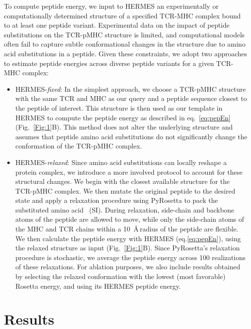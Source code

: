  To compute peptide energy, we input to HERMES an experimentally or computationally determined
 structure of a specified TCR-MHC complex bound to at least one peptide variant. Experimental data
 on the impact of peptide substitutions on the TCR-pMHC structure is limited, and computational
 models often fail to capture subtle conformational changes in the structure due to amino acid
 substitutions in a peptide. Given these constraints, we adopt two approaches to estimate peptide
 energies across diverse peptide variants for a given TCR-MHC complex:
\begin{itemize}
	\item HERMES-{\em fixed}: In the simplest approach, we choose a TCR-pMHC structure with the same
	TCR and MHC as our query and a peptide sequence closest to the peptide of interest. This structure
	is then used as our template in HERMES to compute the peptide energy as described in
	eq.~\ref{eq:pepEn} (Fig.~\ref{Fig:1}B). This method does not alter the underlying structure and
	assumes that peptide amino acid substitutions do not significantly change the conformation of the
	TCR-pMHC complex.
	
	\item HERMES-{\em relaxed}: Since amino acid substitutions can locally reshape a protein complex,
	we introduce a more involved protocol to account for these structural changes. We begin with the
	closest available structure for the TCR-pMHC complex. We then mutate the original peptide to the
	desired state and apply a relaxation procedure using PyRosetta to pack the substituted amino
	acid~\cite{Chaudhury2010-mo} (SI). During relaxation, side-chain and backbone atoms of the peptide
	are allowed to move, while only the side-chain atoms of the MHC and TCR chains within a
	10~\AA\,radius of the peptide are flexible. We then calculate the peptide energy with HERMES
	(eq.\ref{eq:pepEn}), using the relaxed structure as input (Fig.~\ref{Fig:1}B). Since PyRosetta's
	relaxation procedure is stochastic, we average the peptide energy across 100 realizations of these
	relaxations. {For ablation purposes, we also include results obtained by selecting the relaxed
	conformation with the lowest (most favorable) Rosetta energy, and using its HERMES peptide energy.}
\end{itemize}




\section{Results}
